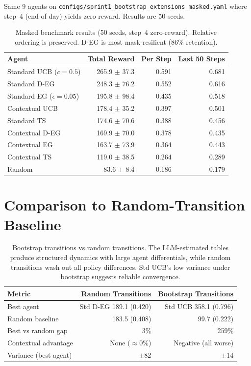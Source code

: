 \documentclass[11pt]{article}
\begin{document}
Same 9 agents on \texttt{configs/sprint1\_bootstrap\_extensions\_masked.yaml} where step~4 (end of day) yields zero reward. Results are 50 seeds.

\begin{table}[h]
\centering
\begin{tabular}{lrrr}
\toprule
Agent & Total Reward & Per Step & Last 50 Steps \\
\midrule
Standard UCB ($c=0.5$) & 265.9 $\pm$ 37.3 & 0.591 & 0.681 \\
Standard D-EG & 248.3 $\pm$ 76.2 & 0.552 & 0.616 \\
Standard EG ($\epsilon=0.05$) & 195.8 $\pm$ 98.4 & 0.435 & 0.518 \\
Contextual UCB & 178.4 $\pm$ 35.2 & 0.397 & 0.501 \\
Standard TS & 174.6 $\pm$ 70.6 & 0.388 & 0.456 \\
Contextual D-EG & 169.9 $\pm$ 70.0 & 0.378 & 0.435 \\
Contextual EG & 163.7 $\pm$ 73.9 & 0.364 & 0.443 \\
Contextual TS & 119.0 $\pm$ 38.5 & 0.264 & 0.289 \\
Random & 83.6 $\pm$ 8.4 & 0.186 & 0.179 \\
\bottomrule
\end{tabular}
\caption{Masked benchmark results (50 seeds, step~4 zero-reward). Relative ordering is preserved. D-EG is most mask-resilient (86\% retention).}
\end{table}

\section{Comparison to Random-Transition Baseline}

\begin{table}[h]
\centering
\begin{tabular}{lrr}
\toprule
Metric & Random Transitions & Bootstrap Transitions \\
\midrule
Best agent & Std D-EG 189.1 (0.420) & Std UCB 358.1 (0.796) \\
Random baseline & 183.5 (0.408) & 99.7 (0.222) \\
Best vs random gap & 3\% & 259\% \\
Contextual advantage & None ($\approx$0\%) & Negative (all worse) \\
Variance (best agent) & $\pm$82 & $\pm$14 \\
\bottomrule
\end{tabular}
\caption{Bootstrap transitions vs random transitions. The LLM-estimated tables produce structured dynamics with large agent differentials, while random transitions wash out all policy differences. Std UCB's low variance under bootstrap suggests reliable convergence.}
\end{table}
\end{document}
